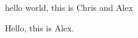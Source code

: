 \documentclass{report}
\begin{document}
hello world, this is Chris and Alex

Hello, this is Alex.
\end{document}
